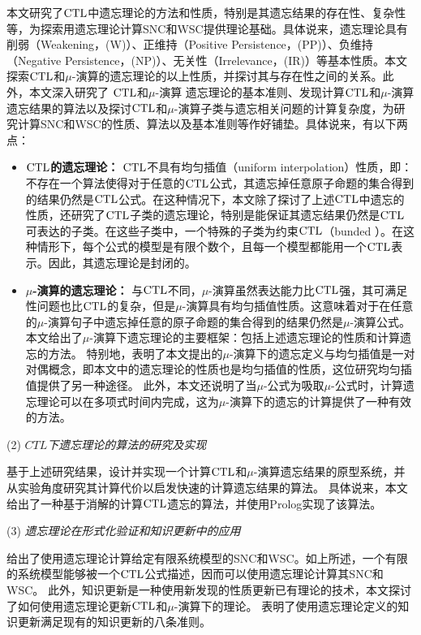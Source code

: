 本文研究了$\textrm{CTL}$中遗忘理论的方法和性质，特别是其遗忘结果的存在性、复杂性等，为探索用遗忘理论计算SNC和WSC提供理论基础。具体说来，遗忘理论具有削弱（Weakening，(W)）、正维持（Positive Persistence，(PP)）、负维持（Negative Persistence，(NP)）、无关性（Irrelevance，(IR)）等基本性质\cite{Yan:AIJ:2009}。本文探索$\textrm{CTL}$和$\mu$-演算的遗忘理论的以上性质，并探讨其与存在性之间的关系。此外，本文深入研究了 $\textrm{CTL}$和$\mu$-演算 遗忘理论的基本准则、发现计算$\textrm{CTL}$和$\mu$-演算遗忘结果的算法以及探讨$\textrm{CTL}$和$\mu$-演算子类与遗忘相关问题的计算复杂度，为研究计算SNC和WSC的性质、算法以及基本准则等作好铺垫。具体说来，有以下两点：
\begin{itemize}
	\item \textbf{$\textrm{CTL}$的遗忘理论：}
	$\textrm{CTL}$不具有均匀插值（uniform interpolation）性质\cite{Maksimova:JANCL:1991}，即：不存在一个算法使得对于任意的$\textrm{CTL}$公式，其遗忘掉任意原子命题的集合得到的结果仍然是$\textrm{CTL}$公式。在这种情况下，本文除了探讨了上述$\textrm{CTL}$中遗忘的性质，还研究了$\textrm{CTL}$子类的遗忘理论，特别是能保证其遗忘结果仍然是$\textrm{CTL}$可表达的子类。在这些子类中，一个特殊的子类为约束$\textrm{CTL}$（bunded \CTL）。在这种情形下，每个公式的模型是有限个数个，且每一个模型都能用一个$\textrm{CTL}$表示。因此，其遗忘理论是封闭的。
	
	\item \textbf{$\mu$-演算的遗忘理论：}
	与$\textrm{CTL}$不同，$\mu$-演算虽然表达能力比$\textrm{CTL}$强，其可满足性问题也比$\textrm{CTL}$的复杂，但是$\mu$-演算具有均匀插值性质\cite{DBLP:DAgostino:JAL:2006}。这意味着对于在任意的$\mu$-演算句子中遗忘掉任意的原子命题的集合得到的结果仍然是$\mu$-演算公式。本文给出了$\mu$-演算下遗忘理论的主要框架：包括上述遗忘理论的性质和计算遗忘的方法。
	特别地，表明了本文提出的$\mu$-演算下的遗忘定义与均匀插值是一对对偶概念，即本文中的遗忘理论的性质也是均匀插值的性质，这位研究均匀插值提供了另一种途径。
	此外，本文还说明了当$\mu$-公式为吸取$\mu$-公式时，计算遗忘理论可以在多项式时间内完成，这为$\mu$-演算下的遗忘的计算提供了一种有效的方法。
\end{itemize}


(2) {\em $CTL$下遗忘理论的算法的研究及实现}

基于上述研究结果，设计并实现一个计算$\textrm{CTL}$和$\mu$-演算遗忘结果的原型系统，并从实验角度研究其计算代价以启发快速的计算遗忘结果的算法。
具体说来，本文给出了一种基于消解的计算$\textrm{CTL}$遗忘的算法，并使用Prolog实现了该算法。

(3) {\em 遗忘理论在形式化验证和知识更新中的应用}

给出了使用遗忘理论计算给定有限系统模型的SNC和WSC。如上所述，一个有限的系统模型能够被一个$\textrm{CTL}$公式描述，因而可以使用遗忘理论计算其SNC和WSC。
此外，知识更新是一种使用新发现的性质更新已有理论的技术，本文探讨了如何使用遗忘理论更新$\textrm{CTL}$和$\mu$-演算下的理论。
表明了使用遗忘理论定义的知识更新满足现有的知识更新的八条准则。

